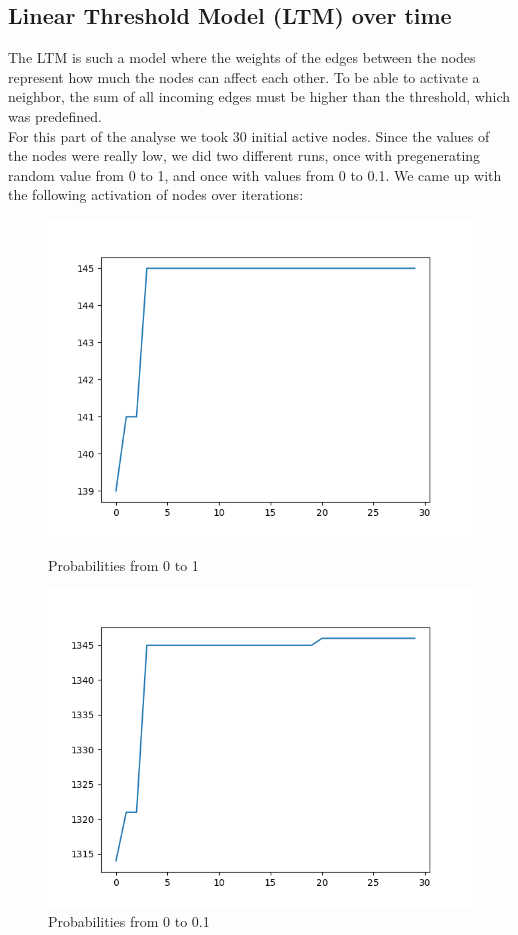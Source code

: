 \subsection{Linear Threshold Model (LTM) over time}
The LTM is such a model where the weights of the edges between the nodes represent how much the nodes can affect each other. To be able to activate a neighbor, the sum of all incoming edges must be higher than the threshold, which was predefined. \\
For this part of the analyse we took 30 initial active nodes. Since the values of the nodes were really low, we did two different runs, once with pregenerating random value from 0 to 1, and once with values from 0 to 0.1. We came up with the following activation of nodes over iterations:
\begin{figure}[H]
    \includegraphics[width=\linewidth]{Report/figs/sumLTM-0to1.png}
    \caption{Probabilities from 0 to 1}\label{fig:sumLTM01}
\endminipage\hfill
{}
    \includegraphics[width=\linewidth]{Report/figs/sumLTM.png}
    \caption{Probabilities from 0 to 0.1}\label{fig:sumltm}
\endminipage
\end{figure}
